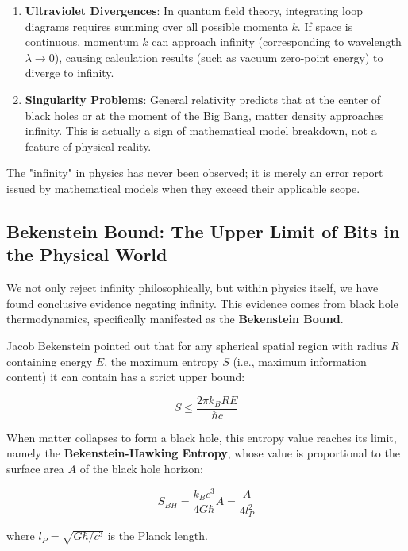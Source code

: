 \begin{enumerate}
\item \textbf{Ultraviolet Divergences}: In quantum field theory, integrating loop diagrams requires summing over all possible momenta $k$. If space is continuous, momentum $k$ can approach infinity (corresponding to wavelength $\lambda \to 0$), causing calculation results (such as vacuum zero-point energy) to diverge to infinity.

\item \textbf{Singularity Problems}: General relativity predicts that at the center of black holes or at the moment of the Big Bang, matter density approaches infinity. This is actually a sign of mathematical model breakdown, not a feature of physical reality.
\end{enumerate}

The "infinity" in physics has never been observed; it is merely an error report issued by mathematical models when they exceed their applicable scope.

\subsection{Bekenstein Bound: The Upper Limit of Bits in the Physical World}

We not only reject infinity philosophically, but within physics itself, we have found conclusive evidence negating infinity. This evidence comes from black hole thermodynamics, specifically manifested as the \textbf{Bekenstein Bound}.

Jacob Bekenstein pointed out that for any spherical spatial region with radius $R$ containing energy $E$, the maximum entropy $S$ (i.e., maximum information content) it can contain has a strict upper bound:

\begin{equation}
S \le \frac{2\pi k_B R E}{\hbar c}
\end{equation}

When matter collapses to form a black hole, this entropy value reaches its limit, namely the \textbf{Bekenstein-Hawking Entropy}, whose value is proportional to the surface area $A$ of the black hole horizon:

\begin{equation}
S_{BH} = \frac{k_B c^3}{4G\hbar} A = \frac{A}{4 l_P^2}
\end{equation}

where $l_P = \sqrt{G\hbar/c^3}$ is the Planck length.

